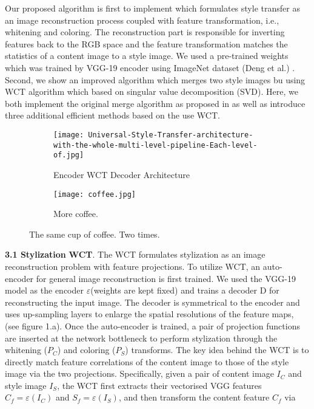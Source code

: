 \hspace{0.5cm} Our proposed algorithm is first to implement \cite{bib11} which formulates style transfer as an image reconstruction process coupled with feature transformation,
i.e., whitening and coloring. The reconstruction part is responsible for inverting features back to the
RGB space and the feature transformation matches the statistics of a content image to a style image.
We used a pre-trained weights which was trained by VGG-19 \cite{bib20} encoder using ImageNet dataset (Deng et al.) \cite{bib21}.
Second, we show an improved algorithm which merges two style images bu using WCT algorithm which based on singular value decomposition (SVD). Here, we both implement the original merge algorithm as proposed in \cite{bib11} as well as introduce three additional efficient methods based on the use WCT.
\begin{figure}[h!]
	\centering
	\begin{subfigure}[b]{0.4\linewidth}
		\texttt{[image: Universal-Style-Transfer-architecture-with-the-whole-multi-level-pipeline-Each-level-of.jpg]}
		\caption{Encoder WCT Decoder Architecture}
	\end{subfigure}
	\begin{subfigure}[b]{0.4\linewidth}
		\texttt{[image: coffee.jpg]}
		\caption{More coffee.}
	\end{subfigure}
	\caption{The same cup of coffee. Two times.}
	\label{fig:coffee}
\end{figure}
\newline
\newline\textbf{3.1  Stylization}\newline
\newline \textbf{WCT}. The WCT \cite{bib11} formulates stylization as an image reconstruction problem with feature projections. To utilize WCT, an auto-encoder for general image reconstruction is first trained. We used the VGG-19 model \cite{bib20} as the encoder $\varepsilon$(weights are kept fixed) and trains a decoder D for reconstructing the input image. The decoder is symmetrical to the encoder and uses up-sampling layers to enlarge the spatial resolutions of the feature maps,  (see figure 1.a). Once the auto-encoder is trained, a pair of projection functions are inserted at the network bottleneck to perform stylization through the whitening ($P_C$) and coloring ($P_S$) transforms. The key idea behind the WCT is to directly match feature correlations of the content image to those of the style image via the two projections. Specifically, given a pair of content image $I_C$ and style image $I_S$, the WCT first extracts their vectorised VGG features $C_f=\varepsilon(I_C)$ and $S_f=\varepsilon(I_S)$, and then transform the content feature $C_f$ via
